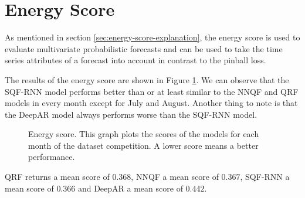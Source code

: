 \section{Energy Score}

As mentioned in section \ref{sec:energy-score-explanation}, the energy score is used to 
evaluate multivariate probabilistic forecasts and can be used to take 
the time series attributes of a forecast into account in contrast to the pinball loss.

The results of the energy score are shown in Figure \ref{fig:energy-score}. 
We can observe that the SQF-RNN model performs better than or at least similar 
to the NNQF and QRF models in every month except for July and August. 
Another thing to note is that the DeepAR model always performs worse than the SQF-RNN model. 

\begin{figure}[ht]
    \centering
    
    \caption[Energy score]{Energy score. 
    This graph plots the scores of the models for each month of the dataset competition. A lower score means a better performance.}
    \label{fig:energy-score}
\end{figure}

QRF returns a mean score of \(0.368\), NNQF a mean score of \(0.367\), 
SQF-RNN a mean score of \(0.366\) and DeepAR a mean score of \(0.442\).